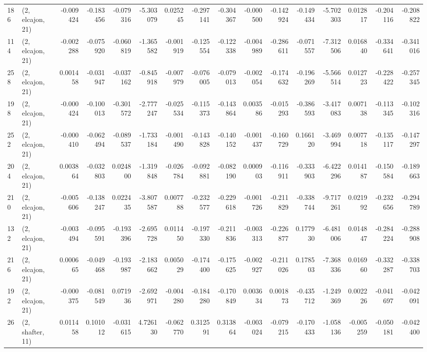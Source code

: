\begin{tabular}{llrrrrrrrrrrrrrr}
186 &  (2, elcajon, 21) &  -0.009424 & -0.183456 & -0.079316 &   -5.303079 &  0.025245 &  -0.297141 & -0.304367 & -0.000500 & -0.142924 & -0.149434 &   -5.702303 &  0.012817 & -0.204116 & -0.208822 \\
114 &  (2, elcajon, 21) &  -0.002288 & -0.075920 & -0.060819 &   -1.365582 & -0.001919 &  -0.125554 & -0.122338 & -0.004989 & -0.286611 & -0.071557 &   -7.312506 &  0.016840 & -0.334641 & -0.341016 \\
258 &  (2, elcajon, 21) &   0.001458 & -0.031947 & -0.037162 &   -0.845918 & -0.007979 &  -0.076005 & -0.079013 & -0.002054 & -0.174632 & -0.196269 &   -5.566514 &  0.012723 & -0.228422 & -0.257345 \\
198 &  (2, elcajon, 21) &  -0.000424 & -0.100013 & -0.301572 &   -2.777247 & -0.025534 &  -0.115373 & -0.143864 &  0.003586 & -0.015293 & -0.386593 &   -3.417083 &  0.007138 & -0.113345 & -0.102316 \\
252 &  (2, elcajon, 21) &  -0.000410 & -0.062494 & -0.089537 &   -1.733184 & -0.001490 &  -0.143828 & -0.140152 & -0.001437 & -0.160729 &  0.166120 &   -3.469994 &  0.007718 & -0.135117 & -0.147297 \\
204 &  (2, elcajon, 21) &   0.003864 & -0.032803 &  0.024800 &   -1.319848 & -0.026784 &  -0.092881 & -0.082190 &  0.000903 & -0.116911 & -0.333903 &   -6.422296 &  0.014187 & -0.150584 & -0.189663 \\
210 &  (2, elcajon, 21) &  -0.005606 & -0.138247 &  0.022435 &   -3.807587 &  0.007788 &  -0.232577 & -0.229618 & -0.001726 & -0.211829 & -0.338744 &   -9.717261 &  0.021992 & -0.232656 & -0.294789 \\
132 &  (2, elcajon, 21) &  -0.003494 & -0.095591 & -0.193396 &   -2.695728 &  0.011450 &  -0.197330 & -0.211836 & -0.003313 & -0.226877 &  0.177930 &   -6.481006 &  0.014847 & -0.284224 & -0.288908 \\
216 &  (2, elcajon, 21) &   0.000665 & -0.049468 & -0.193987 &   -2.183662 &  0.005029 &  -0.174400 & -0.175625 & -0.002927 & -0.211026 &  0.178503 &   -7.368336 &  0.016960 & -0.332287 & -0.338703 \\
192 &  (2, elcajon, 21) &  -0.000375 & -0.081549 &  0.071936 &   -2.692971 & -0.004280 &  -0.184280 & -0.170849 &  0.003634 &  0.001873 & -0.435712 &   -1.249369 &  0.002226 & -0.041697 & -0.042091 \\
26  &  (2, shafter, 11) &   0.011458 &  0.101012 & -0.031615 &    4.726130 & -0.062770 &   0.312591 &  0.313864 & -0.003024 & -0.079215 & -0.170433 &   -1.058136 & -0.005259 & -0.050181 & -0.042400 \\

\end{tabular}
